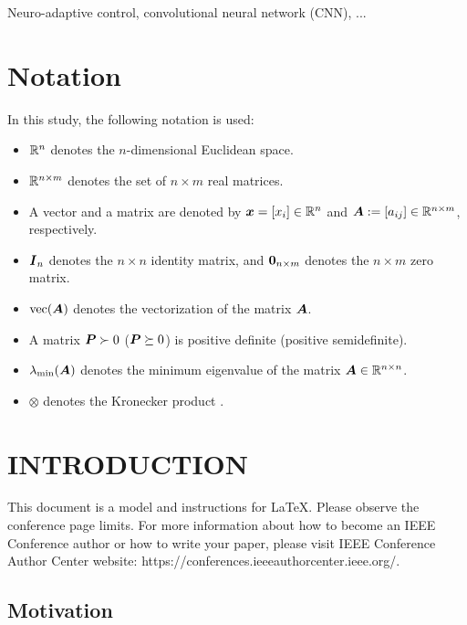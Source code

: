 \documentclass[letterpaper, journal]{IEEEtran}
\begin{document}
\begin{IEEEkeywords}
  Neuro-adaptive control, convolutional neural network (CNN), ...
\end{IEEEkeywords}



\section*{Notation}
In this study, the following notation is used:
\begin{itemize}
  \item $\mathbb{R}^n$ denotes the $n$-dimensional Euclidean space.
  \item $\mathbb{R}^{n\times m}$ denotes the set of $n\times m$ real matrices.
  \item A vector and a matrix are denoted by $\boldsymbol{x}=[x_i]\in\mathbb{R}^n$ and $\boldsymbol{A}:=[a_{ij}]\in\mathbb{R}^{n\times m}$, respectively.
  \item $\boldsymbol{I}_n$ denotes the $n\times n$ identity matrix, and $\boldsymbol{0}_{n\times
              m}$ denotes the $n\times m$ zero matrix.
  \item $\operatorname{vec}(\boldsymbol{A})$ denotes the vectorization of the matrix $\boldsymbol{A}$.
  \item A matrix $\boldsymbol{P} \succ 0$ ($\boldsymbol{P} \succeq 0$) is positive definite
          (positive semidefinite).
  \item $\lambda_{\min}(\boldsymbol{A})$ denotes the minimum eigenvalue of the matrix
          $\boldsymbol{A} \in \mathbb{R}^{n \times n}$.
  \item $\otimes$ denotes the Kronecker product \cite{Bernstein:2009aa}.
\end{itemize}



\section{INTRODUCTION}
This document is a model and instructions for \LaTeX.
Please observe the conference page limits. For more information about how to become an IEEE Conference author or how to write your paper, please visit   IEEE Conference Author Center website: https://conferences.ieeeauthorcenter.ieee.org/.

\subsection{Motivation}
\end{document}
